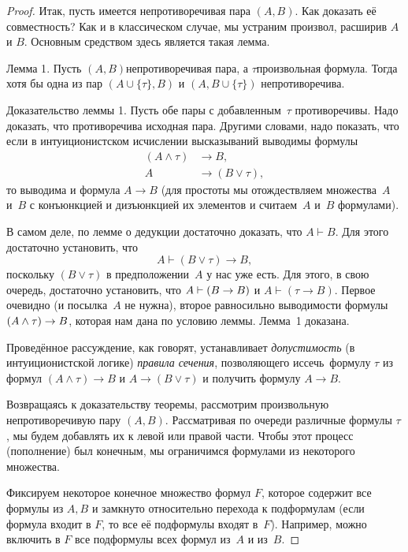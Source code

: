 \begin{proof}
Итак, пусть имеется непротиворечивая пара $(A,B)$. Как доказать
её совместность? Как и в классическом случае, мы устраним
произвол, расширив $A$ и $B$. Основным средством здесь является
такая лемма.

\textsf{Лемма 1}. Пусть $(A,B)$\т непротиворечивая пара,
а $\tau$\т произвольная формула. Тогда хотя бы одна из пар
$(A\cup\{\tau\},B)$ и $(A,B\cup\{\tau\})$ непротиворечива.

Доказательство леммы 1. Пусть обе пары с добавленным~$\tau$
противоречивы. Надо доказать, что противоречива исходная пара.
Другими словами, надо показать, что если в интуиционистском
исчислении высказываний выводимы формулы
        \begin{align*}
  (A \land \tau)&\to B,\\
   A            &\to(B \lor \tau),
        \end{align*}
то выводима и формула $A\to B$ (для простоты мы отождествляем
множества~$A$ и~$B$ с конъюнкцией и дизъюнкцией их элементов и
считаем~$A$ и~$B$ формулами).

В самом деле, по лемме о дедукции достаточно доказать, что $A
\vdash B$. Для этого достаточно установить, что
        $$
A\vdash (B\lor \tau) \to B,
        $$
поскольку $(B\lor\tau)$ в предположении~$A$ у нас уже есть. Для
этого, в свою очередь, достаточно установить, что $A\hm\vdash (B\to
B)$ и $A\vdash (\tau\to B)$. Первое очевидно (и посылка~$A$ не
нужна), второе равносильно выводимости формулы $(A\hm\land\tau)\to
B$, которая нам дана по условию леммы.
Лемма~1 доказана.

Проведённое рассуждение, как говорят, устанавливает
\emph{допустимость} (в интуиционистской логике) \emph{правила
сечения},%
%
позволяющего  иссечь\ формулу $\tau$ из формул
$(A\land\tau)\to B$ и $A\to(B\lor\tau)$ и получить формулу $A\to
B$.

Возвращаясь к доказательству теоремы, рассмотрим произвольную
непротиворечивую пару $(A,B)$. Рассматривая по очереди различные
формулы $\tau$, мы будем добавлять их к левой или правой части.
Чтобы этот процесс ( пополнение) был конечным, мы
ограничимся формулами из некоторого множества.

Фиксируем некоторое конечное множество формул $F$, которое
содержит все формулы из $A,B$ и замкнуто относительно перехода к
подформулам (если формула входит в $F$, то все её подформулы
входят в~$F$). Например, можно включить в $F$ все подформулы
всех формул из~$A$ и из~$B$.


\end{proof}
